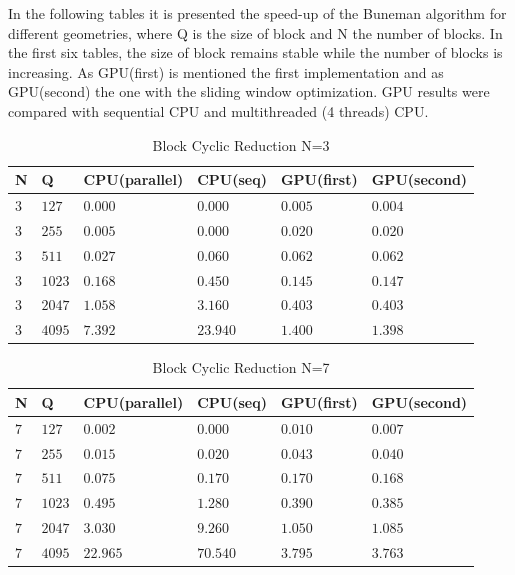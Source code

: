 In the following tables it is presented the speed-up of the Buneman algorithm for different geometries, where Q is the size of block and N the number of blocks. In the first six tables, the size of block remains stable while the number of blocks is increasing. As GPU(first) is mentioned the first implementation and as GPU(second) the one with the sliding window optimization. GPU results were compared with sequential CPU and multithreaded (4 threads) CPU.  

\newpage
    \begin{table}[H]
\caption{Block Cyclic Reduction N=3} 
\centering 
\begin{tabular}{| l |  p{1cm} |p{}| p{} |  p{}| p{}  |} 
\hline\hline 
N & Q & CPU(parallel) & CPU(seq) & GPU(first)  & GPU(second) \\ [0.8ex] 
\hline 
$3$ &	$127$ & $0.000$	& $0.000$ & $0.005$ &  $0.004$ \\
$3$ &	$255$ & $0.005$	&	$0.000$ & $0.020$ & $0.020$ \\
$3$ &	$511$ & $0.027$	&	$0.060$ & $0.062$ & $0.062$ \\
$3$ &	$1023$ & $0.168$	&	$0.450$ & $0.145$ & $0.147$ \\
$3$ &	$2047$ & $1.058$	&	$3.160$ & $0.403$ & $0.403$ \\
$3$ &	$4095$ & $7.392$	&	$23.940$ & $1.400$ & $1.398$ \\[1ex]
\hline 
\end{tabular}
\label{table:bcr_n=3} 
\end{table}

\begin{table}[H]
\caption{Block Cyclic Reduction N=7} 
\centering 
\begin{tabular}{| l |  p{1cm} |p{}| p{} |  p{}| p{}  |} 
\hline\hline 
N & Q & CPU(parallel) & CPU(seq) & GPU(first)  & GPU(second)\\ [0.8ex] 
\hline
$7$ &	$127$ & $0.002$	&	$0.000$ & $0.010$ & $0.007$ \\
$7$ &	$255$ & $0.015$	&	$0.020$ & $0.043$ & $0.040$ \\
$7$ &	$511$ & $0.075$	&	$0.170$ & $0.170$ & $0.168$ \\
$7$ &	$1023$ & $0.495$	&	$1.280$ & $0.390$ & $0.385$ \\
$7$ &	$2047$ & $3.030$	&	$9.260$ & $1.050$ & $1.085$ \\
$7$ &	$4095$ & $22.965$	&	$70.540$ & $3.795$ & $3.763$ \\[1ex]
\hline 
\end{tabular}
\label{table:bcr_n=7} 
\end{table}

